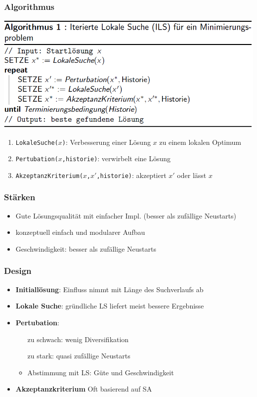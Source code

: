 \documentclass[12pt]{article}
\begin{document}
			\subsubsection{Algorithmus}
					\includegraphics[scale=0.6]{ILS}\\
					\begin{enumerate}
						\item \texttt{LokaleSuche($x$)}: Verbesserung einer Lösung $x$ zu einem lokalen Optimum
						\item \texttt{Pertubation($x$,historie)}: verwirbelt eine Lösung
						\item \texttt{AkzeptanzKriterium($x$,$x'$,historie)}: akzeptiert $x'$ oder lässt $x$
					\end{enumerate}
			\subsubsection{Stärken}
				\begin{itemize}
					\item Gute Lösungsqualität mit einfacher Impl. (besser als zufällige Neustarts)
					\item konzeptuell einfach und modularer Aufbau
					\item Geschwindigkeit: besser als zufällige Neustarts
				\end{itemize}
			\subsubsection{Design}
				\begin{itemize}
					\item \textbf{Initiallösung}: Einfluss nimmt mit Länge des Suchverlaufs ab
					\item \textbf{Lokale Suche}: gründliche LS liefert meist bessere Ergebnisse
					\item \textbf{Pertubation}: 
						\begin{itemize}
							\setlength{\itemindent}{2cm}
							\item[zu schwach:] wenig Diversifikation
							\item[zu stark:] quasi zufällige Neustarts
							\item Abstimmung mit LS: Güte und Geschwindigkeit
						\end{itemize}
					\item \textbf{Akzeptanzkriterium}
						Oft basierend auf SA %
				\end{itemize}
\end{document}
